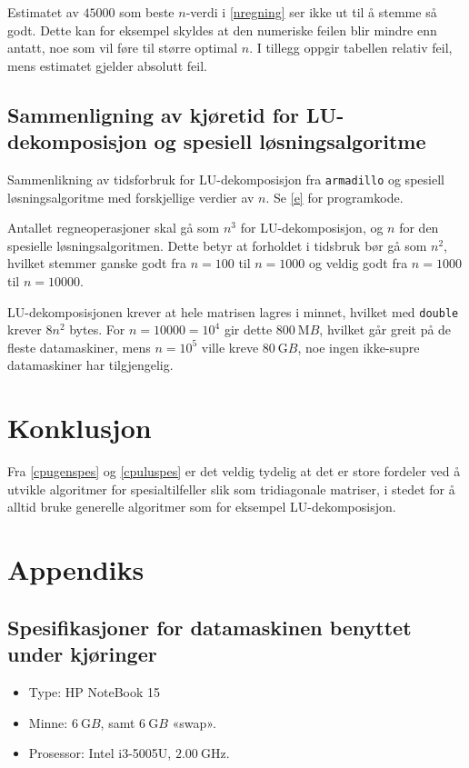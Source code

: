 \documentclass[12pt,norsk,a4paper]{report}
\begin{document}
Estimatet av \(\num{45000}\) som beste \(n\)-verdi i \vref{nregning} ser ikke ut til å stemme så godt. Dette kan for eksempel skyldes at den numeriske feilen blir mindre enn antatt, noe som vil føre til større optimal \(n\). I tillegg oppgir tabellen relativ feil, mens estimatet gjelder absolutt feil.


\subsection{Sammenligning av kjøretid for LU-dekomposisjon og spesiell løsningsalgoritme}

\begin{table}[H]
\centering
\caption{Sammenlikning av tidsforbruk for LU-dekomposisjon fra \texttt{armadillo} og spesiell løsningsalgoritme med forskjellige verdier av \(n\). Se \vref{e}  for programkode.}
\label{cpuluspes}

\end{table}
Antallet regneoperasjoner skal gå som \(n^3\) for LU-dekomposisjon, og \(n\) for den spesielle løsningsalgoritmen. Dette betyr at forholdet i tidsbruk bør gå som \(n^2\), hvilket stemmer ganske godt fra \(n=100\) til \(n=1000\) og veldig godt fra \(n=1000\) til \(n=\num{10000}\).

LU-dekomposisjonen krever at hele matrisen lagres i minnet, hvilket med \texttt{double} krever \(8n^2\) bytes. For \(n=\num{10000}=10^4\) gir dette \(\SI{800}{\mega B}\), hvilket går greit på de fleste datamaskiner, mens \(n=10^5\) ville kreve \(\SI{80}{\giga B}\), noe ingen ikke-supre datamaskiner har tilgjengelig.



\section{Konklusjon}
Fra \vref{cpugenspes} og \vref{cpuluspes} er det veldig tydelig at det er store fordeler ved å utvikle algoritmer for spesialtilfeller slik som tridiagonale matriser, i stedet for å alltid bruke generelle algoritmer som for eksempel LU-dekomposisjon.



\section{Appendiks}

\subsection{Spesifikasjoner for datamaskinen benyttet under kjøringer}
\begin{itemize}
\item Type: HP NoteBook 15
\item Minne: \(\SI{6}{\giga B}\), samt \(\SI{6}{\giga B}\) «swap».
\item Prosessor: Intel i3-5005U, \(\SI{2.00}{\giga\hertz}\).
\end{itemize}
\end{document}
